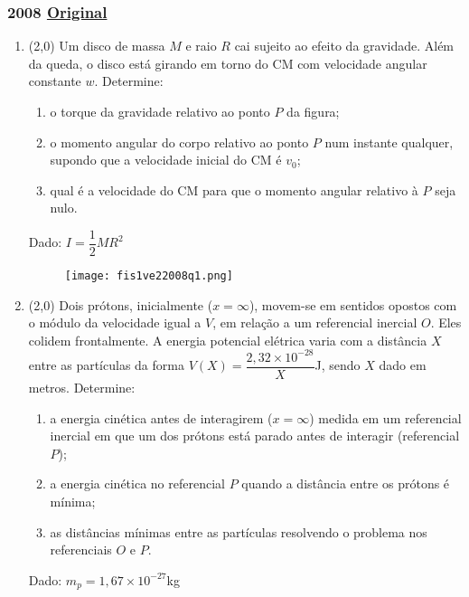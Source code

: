 \documentclass[12pt,a4paper]{article}
\newcommand{\original}[1]{\tiny \href{#1}{Original} \normalsize}
\begin{document}
\subsubsection{2008 \original{https://drive.google.com/open?id=1G6WmRYX6Ozo_Ib6cQp9Km8oPaZ9l8lRp}}

\begin{enumerate}
\item (2,0) Um disco de massa $M$ e raio $R$ cai sujeito ao efeito da gravidade. Além da queda, o disco está girando em torno do CM com velocidade angular constante $w$. Determine:

\begin{enumerate}[label=\alph*)]
\item o torque da gravidade relativo ao ponto $P$ da figura; 
\item o momento angular do corpo relativo ao ponto $P$ num instante qualquer, supondo que a velocidade inicial do CM é $v_0$;
\item qual é a velocidade do CM para que o momento angular relativo à $P$ seja nulo.
\end{enumerate}

Dado: $I=\dfrac{1}{2}MR^2$

\begin{figure}[ht]
\centering
\texttt{[image: fis1ve22008q1.png]}
\end{figure}


\item (2,0) Dois prótons, inicialmente ($x=\infty$), movem-se em sentidos opostos com o módulo da velocidade igual a $V$, em relação a um referencial inercial $O$. Eles 
colidem frontalmente. A energia potencial elétrica varia com a distância $X$ entre as partículas da forma $V(X)=\dfrac{2,32\times 10^{-28}}{X}$J, sendo $X$ dado em metros. Determine:


\begin{enumerate}[label=\alph*)]
\item a energia cinética antes de interagirem ($x=\infty$) medida em um referencial inercial em que um dos prótons está parado antes de interagir (referencial $P$);
\item a energia cinética no referencial $P$ quando a distância entre os prótons é mínima;
\item as distâncias mínimas entre as partículas resolvendo o problema nos referenciais $O$ e $P$.
\end{enumerate}

Dado: $m_p=1,67\times 10^{-27}$kg


\end{enumerate}
\end{document}
